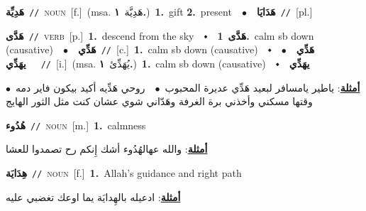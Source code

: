 \documentclass[10pt,a4paper,twoside]{article} %
\begin{document}
\begin{multicols}{2}
{\setlength\topsep{0pt}\textbf{\foreignlanguage{arabic}{هَدِيِّة}}\ {\color{gray}\texttt{//}\color{black}}\ \textsc{noun}\ [f.]\ \color{gray}(msa. \foreignlanguage{arabic}{هَدِيَّة}~\foreignlanguage{arabic}{\textbf{١.}})\color{black}\ \textbf{1.}~gift  \textbf{2.}~present\ \ $\bullet$\ \ \setlength\topsep{0pt}\textbf{\foreignlanguage{arabic}{هَدَايَا}}\ {\color{gray}\texttt{//}\color{black}}\ [pl.]\ } \vspace{2mm}

{\setlength\topsep{0pt}\textbf{\foreignlanguage{arabic}{هَدَّى}}\ {\color{gray}\texttt{//}\color{black}}\ \textsc{verb}\ [p.]\ \textbf{1.}~descend from the sky\ \ $\smblkdiamond$\ \ \setlength\topsep{0pt}\textbf{\foreignlanguage{arabic}{هَدَّى}}\ \textbf{1.}~calm sb down (causative)\ \ $\bullet$\ \ \setlength\topsep{0pt}\textbf{\foreignlanguage{arabic}{هَدِّي}}\ {\color{gray}\texttt{//}\color{black}}\ [c.]\ \textbf{1.}~calm sb down (causative)\ \ $\smblkdiamond$\ \ \setlength\topsep{0pt}\textbf{\foreignlanguage{arabic}{هَدِّي}}\ \ $\bullet$\ \ \setlength\topsep{0pt}\textbf{\foreignlanguage{arabic}{يهَدِّي}}\ {\color{gray}\texttt{//}\color{black}}\ [i.]\ \color{gray}(msa. \foreignlanguage{arabic}{يُهَدِّئ}~\foreignlanguage{arabic}{\textbf{١.}})\color{black}\ \textbf{1.}~calm sb down (causative)\ \ $\smblkdiamond$\ \ \setlength\topsep{0pt}\textbf{\foreignlanguage{arabic}{يهَدِّي}}\  \begin{flushright}\color{gray}\foreignlanguage{arabic}{\textbf{\underline{\foreignlanguage{arabic}{أمثلة}}}: ياطير يامسافر لبعيد هَدِّي عديرة المحبوب\ $\bullet$\ \  روحي هَدِّيه أكيد بيكون فاير دمه\ $\bullet$\ \  وقتها مسكني وأخذني برة الغرفة وهَدّاني شوي عشان كنت مثل الثور الهايج}\end{flushright}\color{black}} \vspace{2mm}

{\setlength\topsep{0pt}\textbf{\foreignlanguage{arabic}{هُدُوء}}\ {\color{gray}\texttt{//}\color{black}}\ \textsc{noun}\ [m.]\ \textbf{1.}~calmness\  \begin{flushright}\color{gray}\foreignlanguage{arabic}{\textbf{\underline{\foreignlanguage{arabic}{أمثلة}}}: والله عهالهُدُوء أشك إِنكم رح تصمدوا للعشا}\end{flushright}\color{black}} \vspace{2mm}

{\setlength\topsep{0pt}\textbf{\foreignlanguage{arabic}{هِدَايَة}}\ {\color{gray}\texttt{//}\color{black}}\ \textsc{noun}\ [f.]\ \textbf{1.}~Allah's guidance and right path\  \begin{flushright}\color{gray}\foreignlanguage{arabic}{\textbf{\underline{\foreignlanguage{arabic}{أمثلة}}}: ادعيله بالهِدايَة يما اوعك تغضبي عليه}\end{flushright}\color{black}} \vspace{2mm}


\end{multicols}
\end{document}
